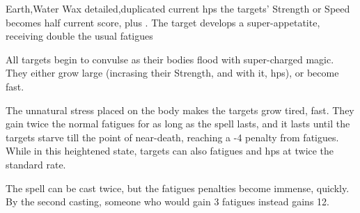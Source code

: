   {Earth,Water}%
  {Wax}%
  {detailed,duplicated}%
  {current \glspl{hp}}%
  {the targets' Strength or Speed becomes half current score, plus . The target develops a super-appetatite, receiving double the usual \glspl{fatigue}}%
  {
    All  targets begin to convulse as their bodies flood with super-charged magic.
    They either grow large (incrasing their Strength, and with it, \glspl{hp}), or become fast.

    The unnatural stress placed on the body makes the targets grow tired, fast.
    They gain twice the normal \glspl{fatigue} for as long as the spell lasts, and it lasts until the targets starve till the point of near-death, reaching a -4 penalty from \glspl{fatigue}.
    While in this heightened state, targets can also \glspl{fatigue} and \glspl{hp} at twice the standard rate.

    The spell can be cast twice, but the \glspl{fatigue} penalties become immense, quickly.
    By the second casting, someone who would gain 3 \glspl{fatigue} instead gains 12.
  }

